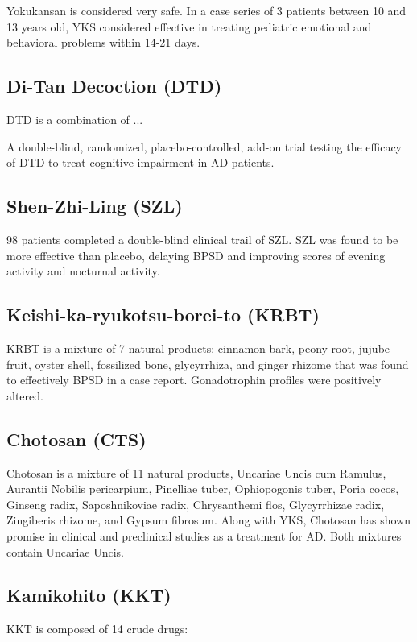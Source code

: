 \documentclass[twocolumn]{article}
\begin{document}
Yokukansan is considered very safe.
In a case series of 3 patients between 10 and 13 years old,
YKS considered effective in treating pediatric emotional and behavioral problems
within 14-21 days.
\cite{tanaka2013potential}


\subsection{Di-Tan Decoction (DTD)}
DTD is a combination of ...

A double-blind, randomized, placebo-controlled, add-on trial
testing the efficacy of DTD to treat cognitive impairment
in AD patients.
\cite{chua2015efficacy}


\subsection{Shen-Zhi-Ling (SZL)}

98 patients completed a double-blind clinical trail of SZL.
SZL was found to be more effective than placebo,
delaying BPSD and improving scores of evening activity
and nocturnal activity.
\cite{pan2014shen}




\subsection{Keishi-ka-ryukotsu-borei-to (KRBT)}

KRBT is a mixture of 7 natural products:
cinnamon bark,
peony root,
jujube fruit,
oyster shell,
fossilized bone,
glycyrrhiza,
and ginger rhizome
that was found to effectively BPSD in a case report.
Gonadotrophin profiles were positively altered.
\cite{niitsu2013behavioural}




\subsection{Chotosan (CTS)}
Chotosan is a mixture of 11 natural products,
Uncariae Uncis cum Ramulus,
Aurantii Nobilis pericarpium,
Pinelliae tuber,
Ophiopogonis tuber,
Poria cocos,
Ginseng radix,
Saposhnikoviae radix,
Chrysanthemi flos,
Glycyrrhizae radix,
Zingiberis rhizome,
and Gypsum fibrosum.
Along with YKS, Chotosan has shown promise in clinical and
preclinical studies as a treatment for AD.
Both mixtures contain Uncariae Uncis.
\cite{matsumoto2013kampo}



\subsection{Kamikohito (KKT)}
KKT is composed of 14 crude drugs:
\end{document}
